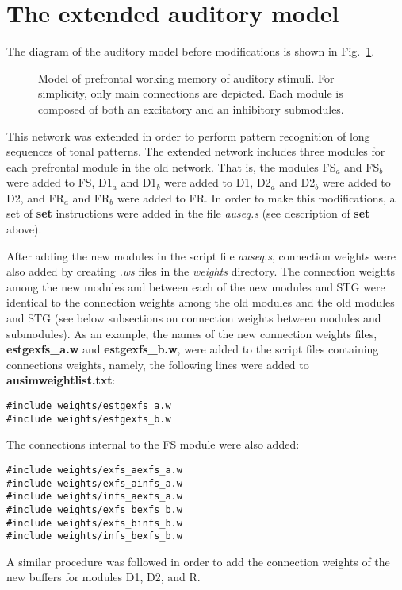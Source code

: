 \documentclass[12pt]{article}
\begin{document}
\section{The extended auditory model}
The diagram of the auditory model before modifications is shown in 
Fig.~\ref{model}.
\begin{figure}[htp]
  \centerline{}
  \caption{Model of prefrontal working memory of auditory 
           stimuli. For simplicity, only main connections are depicted.
           Each module is composed of both an excitatory and
           an inhibitory submodules.}
  \label{model}
\end{figure}
This network was extended in order to perform pattern recognition of
long sequences of tonal patterns. The extended network includes three
modules for each prefrontal module in the old network. That is,
the modules FS$_a$ and FS$_b$ were added to FS, D1$_a$ and D1$_b$ were
added to D1, D2$_a$ and D2$_b$ were added to D2, and FR$_a$ and FR$_b$
were added to FR. In order to make this modifications, a set of {\bf
set} instructions were added in the file {\em auseq.s} (see
description of {\bf set} above). 

After adding the new modules in the script file {\em auseq.s},
connection weights were also added by creating {\em *.ws} files in the
{\em weights} directory. The connection weights among the
new modules and between each of the new modules and STG were identical
to the connection weights among the old modules and the old modules
and STG (see below subsections on connection weights between modules 
and submodules). As an example, the names of the new connection 
weights files, 
{\bf estgexfs\_a.w} and {\bf estgexfs\_b.w}, were added to the script
files containing connections weights, namely, the following lines were
added to {\bf ausimweightlist.txt}: 
\begin{verbatim}
#include weights/estgexfs_a.w
#include weights/estgexfs_b.w
\end{verbatim}
The connections internal to the FS module were also added:
\begin{verbatim}
#include weights/exfs_aexfs_a.w
#include weights/exfs_ainfs_a.w
#include weights/infs_aexfs_a.w
#include weights/exfs_bexfs_b.w
#include weights/exfs_binfs_b.w
#include weights/infs_bexfs_b.w
\end{verbatim}
A similar procedure was followed in order to add the connection
weights of the new buffers for modules D1, D2, and R. 
\end{document}
